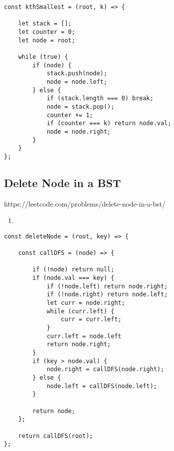 \documentclass[10pt]{article}
\begin{document}
\begin{lstlisting}[title=Solution kthSmallest, captionpos=t]
const kthSmallest = (root, k) => {
    
    let stack = [];
    let counter = 0;
    let node = root;
    
    while (true) {
        if (node) {
            stack.push(node);
            node = node.left;
        } else {
            if (stack.length === 0) break;
            node = stack.pop();
            counter += 1;
            if (counter === k) return node.val;
            node = node.right;
        }
    }
};
\end{lstlisting}
\medskip %
















\pagebreak
\medskip   
\subsection {Delete Node in a BST}
https://leetcode.com/problems/delete-node-in-a-bst/

\begin{enumerate}
	\item 

\end{enumerate}

\begin{lstlisting}[title=Solution deleteNode, captionpos=t]
const deleteNode = (root, key) => {
    
    const callDFS = (node) => {
    
        if (!node) return null;
        if (node.val === key) {
            if (!node.left) return node.right;
            if (!node.right) return node.left;
            let curr = node.right;
            while (curr.left) {
                curr = curr.left;
            }
            curr.left = node.left
            return node.right;
        }
        if (key > node.val) {
            node.right = callDFS(node.right);
        } else {
            node.left = callDFS(node.left);
        }
        
        return node;
    };
    
    return callDFS(root);
};
\end{lstlisting}
\medskip %
\end{document}
